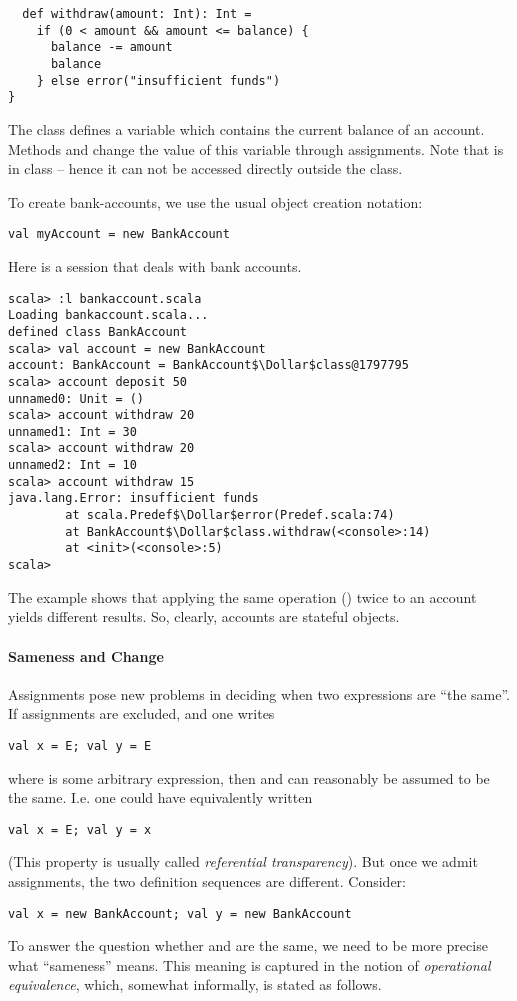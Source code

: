 {\begin{lstlisting}
  def withdraw(amount: Int): Int =
    if (0 < amount && amount <= balance) {
      balance -= amount
      balance
    } else error("insufficient funds")
}
\end{lstlisting}
The class defines a variable  which contains the current
balance of an account. Methods  and 
change the value of this variable through assignments.  Note that
 is  in class  -- hence
it can not be accessed directly outside the class.

To create bank-accounts, we use the usual object creation notation:
\begin{lstlisting}
val myAccount = new BankAccount
\end{lstlisting}

\example Here is a  session that deals with bank
accounts.

\begin{lstlisting}
scala> :l bankaccount.scala
Loading bankaccount.scala...
defined class BankAccount
scala> val account = new BankAccount
account: BankAccount = BankAccount$\Dollar$class@1797795
scala> account deposit 50
unnamed0: Unit = ()
scala> account withdraw 20
unnamed1: Int = 30
scala> account withdraw 20
unnamed2: Int = 10
scala> account withdraw 15
java.lang.Error: insufficient funds
        at scala.Predef$\Dollar$error(Predef.scala:74)
        at BankAccount$\Dollar$class.withdraw(<console>:14)
        at <init>(<console>:5)
scala> 
\end{lstlisting}
The example shows that applying the same operation () twice to an account yields different results. So, clearly,
accounts are stateful objects.  

\paragraph{Sameness and Change}
Assignments pose new problems in deciding when two expressions are
``the same''.
If assignments are excluded, and one writes
\begin{lstlisting}
val x = E; val y = E
\end{lstlisting}
where  is some arbitrary expression,
then  and  can reasonably be assumed to be the same.
I.e. one could have equivalently written
\begin{lstlisting}
val x = E; val y = x
\end{lstlisting}
(This property is usually called {\em referential transparency}). But
once we admit assignments, the two definition sequences are different.
Consider:
\begin{lstlisting}
val x = new BankAccount; val y = new BankAccount
\end{lstlisting}
To answer the question whether  and  are the same, we
need to be more precise what ``sameness'' means. This meaning is
captured in the notion of {\em operational equivalence}, which,
somewhat informally, is stated as follows.

}
